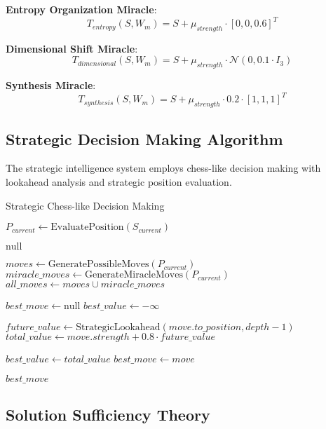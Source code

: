 \documentclass[12pt,a4paper]{article}
\begin{document}
\textbf{Entropy Organization Miracle}:
$$T_{entropy}(S, W_m) = S + \mu_{strength} \cdot [0, 0, 0.6]^T$$

\textbf{Dimensional Shift Miracle}:
$$T_{dimensional}(S, W_m) = S + \mu_{strength} \cdot \mathcal{N}(0, 0.1 \cdot I_3)$$

\textbf{Synthesis Miracle}:
$$T_{synthesis}(S, W_m) = S + \mu_{strength} \cdot 0.2 \cdot [1, 1, 1]^T$$

\subsection{Strategic Decision Making Algorithm}

The strategic intelligence system employs chess-like decision making with lookahead analysis and strategic position evaluation.

\begin{algorithm}
\caption{Strategic Chess-like Decision Making}
\begin{algorithmic}[1]
    \State $P_{current} \gets \text{EvaluatePosition}(S_{current})$
    
        \Return $\text{null}$ 
    \EndIf
    
    \State $moves \gets \text{GeneratePossibleMoves}(P_{current})$
    \State $miracle\_moves \gets \text{GenerateMiracleMoves}(P_{current})$
    \State $all\_moves \gets moves \cup miracle\_moves$
    
    \State $best\_move \gets \text{null}$
    \State $best\_value \gets -\infty$
    
        \State $future\_value \gets \text{StrategicLookahead}(move.to\_position, depth-1)$
        \State $total\_value \gets move.strength + 0.8 \cdot future\_value$
        
            \State $best\_value \gets total\_value$
            \State $best\_move \gets move$
        \EndIf
    \EndFor
    
    \Return $best\_move$
\EndProcedure
\end{algorithmic}
\end{algorithm}

\subsection{Solution Sufficiency Theory}
\end{document}
